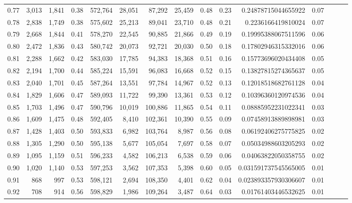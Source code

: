 \begin{tabular}{rrrrrrrrrrrrrrr}
0.77 &   3,013 &  1,841 &  0.38 &  572,764 &   28,051 &   87,292 &   25,459 &  0.48 &  0.23 &    0.24878715044655922 &      0.07 \\
0.78 &   2,838 &  1,749 &  0.38 &  575,602 &   25,213 &   89,041 &   23,710 &  0.48 &  0.21 &     0.2236166419810024 &      0.07 \\
0.79 &   2,668 &  1,844 &  0.41 &  578,270 &   22,545 &   90,885 &   21,866 &  0.49 &  0.19 &    0.19995388067511596 &      0.06 \\
0.80 &   2,472 &  1,836 &  0.43 &  580,742 &   20,073 &   92,721 &   20,030 &  0.50 &  0.18 &    0.17802946315332016 &      0.06 \\
0.81 &   2,288 &  1,662 &  0.42 &  583,030 &   17,785 &   94,383 &   18,368 &  0.51 &  0.16 &    0.15773696020434408 &      0.05 \\
0.82 &   2,194 &  1,700 &  0.44 &  585,224 &   15,591 &   96,083 &   16,668 &  0.52 &  0.15 &    0.13827815274365637 &      0.05 \\
0.83 &   2,040 &  1,701 &  0.45 &  587,264 &   13,551 &   97,784 &   14,967 &  0.52 &  0.13 &    0.12018518682761128 &      0.04 \\
0.84 &   1,829 &  1,606 &  0.47 &  589,093 &   11,722 &   99,390 &   13,361 &  0.53 &  0.12 &    0.10396360120974536 &      0.04 \\
0.85 &   1,703 &  1,496 &  0.47 &  590,796 &   10,019 &  100,886 &   11,865 &  0.54 &  0.11 &    0.08885952231022341 &      0.03 \\
0.86 &   1,609 &  1,475 &  0.48 &  592,405 &    8,410 &  102,361 &   10,390 &  0.55 &  0.09 &    0.07458913889898981 &      0.03 \\
0.87 &   1,428 &  1,403 &  0.50 &  593,833 &    6,982 &  103,764 &    8,987 &  0.56 &  0.08 &    0.06192406275775825 &      0.02 \\
0.88 &   1,305 &  1,290 &  0.50 &  595,138 &    5,677 &  105,054 &    7,697 &  0.58 &  0.07 &    0.05034988603205293 &      0.02 \\
0.89 &   1,095 &  1,159 &  0.51 &  596,233 &    4,582 &  106,213 &    6,538 &  0.59 &  0.06 &    0.04063822050358755 &      0.02 \\
0.90 &   1,020 &  1,140 &  0.53 &  597,253 &    3,562 &  107,353 &    5,398 &  0.60 &  0.05 &   0.031591737545565005 &      0.01 \\
0.91 &     868 &    997 &  0.53 &  598,121 &    2,694 &  108,350 &    4,401 &  0.62 &  0.04 &   0.023893357930306607 &      0.01 \\
0.92 &     708 &    914 &  0.56 &  598,829 &    1,986 &  109,264 &    3,487 &  0.64 &  0.03 &    0.01761403446532625 &      0.01 \\

\end{tabular}
